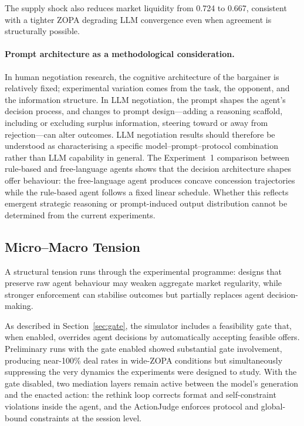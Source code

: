 The supply shock also reduces market liquidity from 0.724 to 0.667, consistent with a tighter ZOPA degrading LLM convergence even when agreement is structurally possible.

\paragraph{Prompt architecture as a methodological consideration.}
In human negotiation research, the cognitive architecture of the bargainer is relatively fixed; experimental variation comes from the task, the opponent, and the information structure.  In LLM negotiation, the prompt shapes the agent's decision process, and changes to prompt design---adding a reasoning scaffold, including or excluding surplus information, steering toward or away from rejection---can alter outcomes.  LLM negotiation results should therefore be understood as characterising a specific model--prompt--protocol combination rather than LLM capability in general.  The Experiment~1 comparison between rule-based and free-language agents shows that the decision architecture shapes offer behaviour: the free-language agent produces concave concession trajectories while the rule-based agent follows a fixed linear schedule.  Whether this reflects emergent strategic reasoning or prompt-induced output distribution cannot be determined from the current experiments.

\subsection{Micro--Macro Tension}
\label{sec:disc-micro-macro}

A structural tension runs through the experimental programme: designs that preserve raw agent behaviour may weaken aggregate market regularity, while stronger enforcement can stabilise outcomes but partially replaces agent decision-making.

As described in Section~\ref{sec:gate}, the simulator includes a feasibility gate that, when enabled, overrides agent decisions by automatically accepting feasible offers.  Preliminary runs with the gate enabled showed substantial gate involvement, producing near-100\% deal rates in wide-ZOPA conditions but simultaneously suppressing the very dynamics the experiments were designed to study.  With the gate disabled, two mediation layers remain active between the model's generation and the enacted action: the rethink loop corrects format and self-constraint violations inside the agent, and the ActionJudge enforces protocol and global-bound constraints at the session level.

